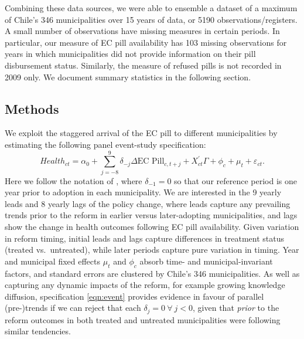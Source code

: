 \documentclass[12pt]{article}
\begin{document}
\begin{spacing}{1.9}
Combining these data sources, we were able to ensemble a dataset of a maximum of Chile's 346 municipalities over 15 years of data, or 5190 observations/registers. A small number of observations have missing measures in certain periods. In particular, our measure of EC pill availability has 103 missing observations for years in which municipalities did not provide information on their pill disbursement status. Similarly, the measure of refused pills is not recorded in 2009 only.  We document summary statistics in the following section.


\subsection{Methods}
\label{scn:methods}
We exploit the staggered arrival of the EC pill to different municipalities by estimating
the following panel event-study specification:
\begin{equation}
  \label{eqn:event}
  Health_{ct} = \alpha_0 + \sum_{j=-8}^{9}\delta_{-j}\Delta \text{EC Pill}_{c,t+j} +
  X_{ct}^\prime\Gamma + \phi_c + \mu_t + \varepsilon_{ct}.
\end{equation}
Here we follow the notation of \citet{Freyaldenhovenetal2018}, where $\delta_{-1}=0$ so that
our reference period is one year prior to adoption in each municipality.  We are
interested in the 9 yearly leads and 8 yearly lags of the policy change, where leads capture
any prevailing trends prior to the reform in earlier versus later-adopting municipalities, and
lags show the change in health outcomes following EC pill availability. Given variation in
reform timing, initial leads and lags capture differences in treatment status (treated vs.\
untreated), while later periods capture pure variation in timing. Year and municipal fixed
effects $\mu_t$ and $\phi_c$ absorb time- and municipal-invariant factors, and standard
errors are clustered by Chile's 346 municipalities. As well as capturing any dynamic impacts
of the reform, for example growing knowledge diffusion, specification \ref{eqn:event}
provides evidence in favour of parallel (pre-)trends if we can reject that each
$\delta_{j}=0\ \forall\ j < 0$, given that \emph{prior} to the reform outcomes in both
treated and untreated municipalities were following similar tendencies.


\end{spacing}
\end{document}
